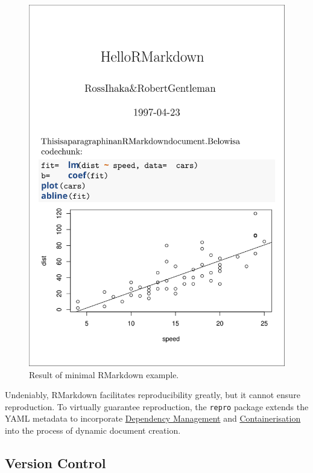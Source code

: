 \documentclass[12pt,a4paper,]{article}
\begin{document}
\begin{figure}

{\centering \includegraphics[width=1\linewidth]{images/rmarkdown} 

}

\caption{Result of minimal RMarkdown example.}\label{fig:rmarkdown}
\end{figure}

Undeniably, RMarkdown facilitates reproducibility greatly, but it cannot ensure reproduction. To virtually guarantee reproduction, the \texttt{repro} package extends the YAML metadata to incorporate \protect\hyperlink{dependency-management}{Dependency Management} and \protect\hyperlink{containerisation}{Containerisation} into the process of dynamic document creation.

\hypertarget{version-control}{%
\subsection{Version Control}\label{version-control}}
\end{document}
